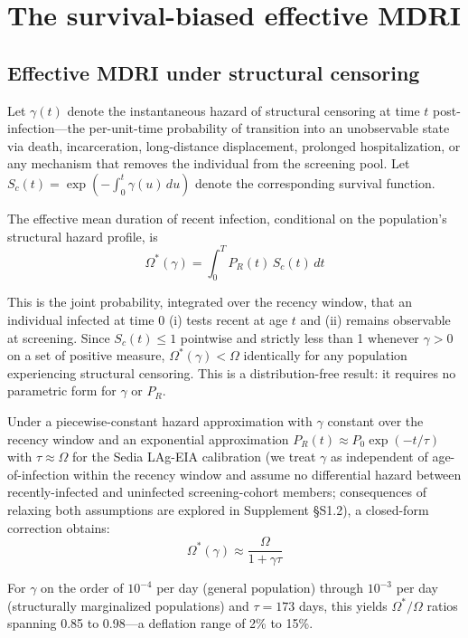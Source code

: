 \documentclass[12pt]{article}
\begin{document}
\section{The survival-biased effective MDRI}

\subsection{Effective MDRI under structural censoring}

Let $\gamma(t)$ denote the instantaneous hazard of structural censoring at time $t$ post-infection---the per-unit-time probability of transition into an unobservable state via death, incarceration, long-distance displacement, prolonged hospitalization, or any mechanism that removes the individual from the screening pool. Let $S_c(t) = \exp\left(-\int_0^t \gamma(u)\, du\right)$ denote the corresponding survival function.

The effective mean duration of recent infection, conditional on the population's structural hazard profile, is
\begin{equation}
\Omega^*(\gamma) = \int_0^T P_R(t)\, S_c(t)\, dt
\end{equation}

This is the joint probability, integrated over the recency window, that an individual infected at time 0 (i) tests recent at age $t$ and (ii) remains observable at screening. Since $S_c(t) \leq 1$ pointwise and strictly less than 1 whenever $\gamma > 0$ on a set of positive measure, $\Omega^*(\gamma) < \Omega$ identically for any population experiencing structural censoring. This is a distribution-free result: it requires no parametric form for $\gamma$ or $P_R$.

Under a piecewise-constant hazard approximation with $\gamma$ constant over the recency window and an exponential approximation $P_R(t) \approx P_0 \exp(-t/\tau)$ with $\tau \approx \Omega$ for the Sedia LAg-EIA calibration \cite{sedia} (we treat $\gamma$ as independent of age-of-infection within the recency window and assume no differential hazard between recently-infected and uninfected screening-cohort members; consequences of relaxing both assumptions are explored in Supplement \S S1.2), a closed-form correction obtains:
\begin{equation}
\Omega^*(\gamma) \approx \frac{\Omega}{1 + \gamma\tau}
\end{equation}

For $\gamma$ on the order of $10^{-4}$ per day (general population) through $10^{-3}$ per day (structurally marginalized populations) and $\tau = 173$ days, this yields $\Omega^*/\Omega$ ratios spanning 0.85 to 0.98---a deflation range of 2\% to 15\%.
\end{document}

